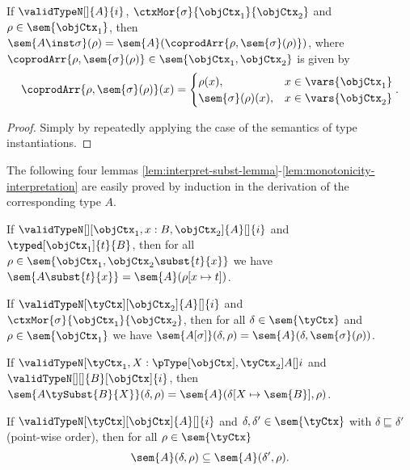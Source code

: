 \documentclass[preprint]{sigplanconf}
\begin{document}
\begin{lemma}
  \label{lem:move-inst-to-valuation}
  If $\validTypeN[]{A}{i}$,
  $\ctxMor{\sigma}{\objCtx_1}{\objCtx_2}$
  and $\rho \in \sem{\objCtx_1}$, then
  $\sem{A \inst \sigma}(\rho)
  = \sem{A}(\coprodArr{\rho, \sem{\sigma}(\rho)})$,
  where $\coprodArr{\rho, \sem{\sigma}(\rho)} \in \sem{\objCtx_1, \objCtx_2}$ is
  given by
  \begin{equation*}
    \coprodArr{\rho, \sem{\sigma}(\rho)}(x) =
    \begin{cases}
      \rho(x), & x \in \vars{\objCtx_1} \\
      \sem{\sigma}(\rho)(x), & x \in \vars{\objCtx_2}
    \end{cases}.
  \end{equation*}
\end{lemma}
\begin{proof}
  Simply by repeatedly applying the case of the semantics of type
  instantiations.
\end{proof}

The following four lemmas
\ref{lem:interpret-subst-lemma}-\ref{lem:monotonicity-interpretation}
are easily proved by induction in the derivation of the corresponding type $A$.
\begin{lemma}
  \label{lem:interpret-subst-lemma}
  If $\validTypeN[][\objCtx_1, x : B, \objCtx_2]{A}[]{i}$ and
  $\typed[\objCtx_1]{t}{B}$, then
  for all $\rho \in \sem{\objCtx_1, \objCtx_2 \subst{t}{x}}$ we have
  $\sem{A\subst{t}{x}} = \sem{A}(\rho[x \mapsto t])$.
\end{lemma}

\begin{lemma}
  \label{lem:interpret-move-subst}
  If $\validTypeN[\tyCtx][\objCtx_2]{A}[]{i}$ and
  $\ctxMor{\sigma}{\objCtx_1}{\objCtx_2}$, then
  for all $\delta \in \sem{\tyCtx}$ and $\rho \in \sem{\objCtx_1}$ we have
  $\sem{A [\sigma]}(\delta, \rho) = \sem{A}(\delta, \sem{\sigma}(\rho))$.
\end{lemma}

\begin{lemma}
  \label{lem:interpret-move-ty-subst}
  If $\validTypeN[\tyCtx_1, X : {\pType[\objCtx]}, \tyCtx_2]{A}[]{i}$
  and $\validTypeN[][]{B}[\objCtx]{i}$, then
  $\sem{A \tySubst{B}{X}}(\delta, \rho)
  = \sem{A}(\delta [X \mapsto \sem{B}], \rho)$.
\end{lemma}


\begin{lemma}
  \label{lem:monotonicity-interpretation}
  If $\validTypeN[\tyCtx][\objCtx]{A}[]{i}$ and
  $\delta, \delta' \in \sem{\tyCtx}$ with $\delta \sqsubseteq \delta'$
  (point-wise order), then for all $\rho \in \sem{\tyCtx}$
  \begin{equation*}
    \sem{A}(\delta, \rho) \subseteq \sem{A}(\delta', \rho).
  \end{equation*}
\end{lemma}
\end{document}
